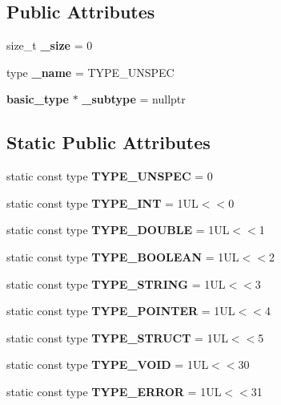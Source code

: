 \subsection*{Public Attributes}
\begin{DoxyCompactItemize}
\item 
size\+\_\+t {\bfseries \+\_\+size} = 0\label{structbasic__type_a7d0e7cd683e46caea2c165fb8ebf26c5}

\item 
type {\bfseries \+\_\+name} = T\+Y\+P\+E\+\_\+\+U\+N\+S\+P\+E\+C\label{structbasic__type_a3fc97d3a8fc1f7ab3d037359ad705a42}

\item 
{\bf basic\+\_\+type} $\ast$ {\bfseries \+\_\+subtype} = nullptr\label{structbasic__type_a2ce9b0a06193a2bd685f106bc72a6089}

\end{DoxyCompactItemize}
\subsection*{Static Public Attributes}
\begin{DoxyCompactItemize}
\item 
static const type {\bfseries T\+Y\+P\+E\+\_\+\+U\+N\+S\+P\+E\+C} = 0\label{structbasic__type_a7787995e345f10d3cc6c48d0708c8a36}

\item 
static const type {\bfseries T\+Y\+P\+E\+\_\+\+I\+N\+T} = 1\+U\+L$<$$<$0\label{structbasic__type_a6c904b5d042062de5ac5c454bc9426a6}

\item 
static const type {\bfseries T\+Y\+P\+E\+\_\+\+D\+O\+U\+B\+L\+E} = 1\+U\+L$<$$<$1\label{structbasic__type_aa8786b1860b50978829feb20e614b4c3}

\item 
static const type {\bfseries T\+Y\+P\+E\+\_\+\+B\+O\+O\+L\+E\+A\+N} = 1\+U\+L$<$$<$2\label{structbasic__type_a62f257e76816cc338762e6a1182174ef}

\item 
static const type {\bfseries T\+Y\+P\+E\+\_\+\+S\+T\+R\+I\+N\+G} = 1\+U\+L$<$$<$3\label{structbasic__type_a2f6ab0d223597c328005e6c2276f523e}

\item 
static const type {\bfseries T\+Y\+P\+E\+\_\+\+P\+O\+I\+N\+T\+E\+R} = 1\+U\+L$<$$<$4\label{structbasic__type_a9ded574c7b6d0a63acd29b87d8c16efe}

\item 
static const type {\bfseries T\+Y\+P\+E\+\_\+\+S\+T\+R\+U\+C\+T} = 1\+U\+L$<$$<$5\label{structbasic__type_a0e3320ba9749776fbf1303d353fec55e}

\item 
static const type {\bfseries T\+Y\+P\+E\+\_\+\+V\+O\+I\+D} = 1\+U\+L$<$$<$30\label{structbasic__type_a59e3a52115cbe7ac8a43d64072bb98a3}

\item 
static const type {\bfseries T\+Y\+P\+E\+\_\+\+E\+R\+R\+O\+R} = 1\+U\+L$<$$<$31\label{structbasic__type_af5146fc165cffff72de991842d60840c}

\end{DoxyCompactItemize}


